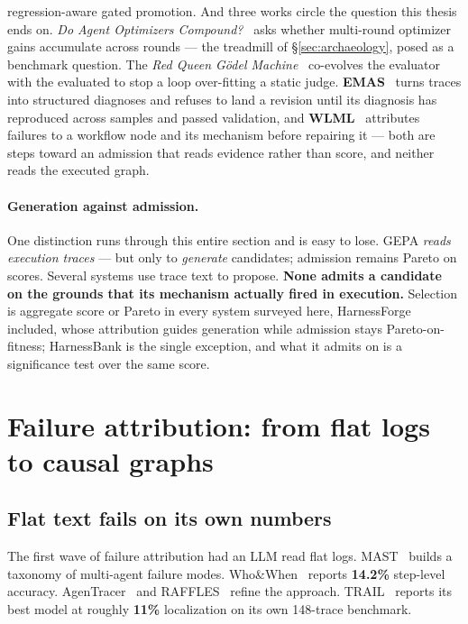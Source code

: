 regression-aware gated promotion. And three works circle the question this
thesis ends on. \emph{Do Agent Optimizers Compound?}~\cite{compound} asks
whether multi-round optimizer gains accumulate across rounds --- the
treadmill of \S\ref{sec:archaeology}, posed as a benchmark question. The
\emph{Red Queen G\"odel Machine}~\cite{redqueen} co-evolves the evaluator
with the evaluated to stop a loop over-fitting a static judge.
\textbf{EMAS}~\cite{emas} turns traces into structured diagnoses and
refuses to land a revision until its diagnosis has reproduced across
samples and passed validation, and \textbf{WLML}~\cite{wlml} attributes
failures to a workflow node and its mechanism before repairing it ---
both are steps toward an admission that reads evidence rather than
score, and neither reads the executed graph.

\paragraph{Generation against admission.} One distinction runs through this
entire section and is easy to lose. GEPA \emph{reads execution traces} ---
but only to \emph{generate} candidates; admission remains Pareto on scores.
Several systems use trace text to propose. \textbf{None admits a candidate
on the grounds that its mechanism actually fired in execution.} Selection
is aggregate score or Pareto in every system surveyed here, HarnessForge
included, whose attribution guides generation while admission stays
Pareto-on-fitness; HarnessBank is the single exception, and what it admits
on is a significance test over the same score.

\section{Failure attribution: from flat logs to causal graphs}
\label{sec:attribution}

\subsection*{Flat text fails on its own numbers}

The first wave of failure attribution had an LLM read flat logs.
MAST~\cite{mast} builds a taxonomy of multi-agent failure modes.
Who\&When~\cite{whowhen} reports \textbf{14.2\%} step-level accuracy.
AgenTracer~\cite{agentracer} and RAFFLES~\cite{raffles} refine the
approach. TRAIL~\cite{trail} reports its best model at roughly
\textbf{11\%} localization on its own 148-trace benchmark.

